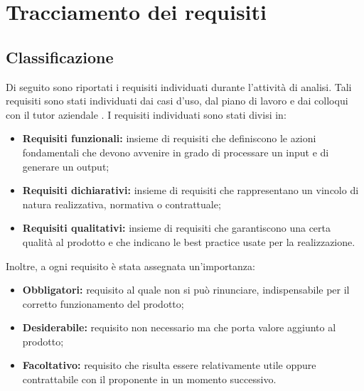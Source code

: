 \section{Tracciamento dei requisiti}\label{sec:tracciamento-dei-requisiti}
\setcounter{rowcount}{0}
\setcounter{subCount}{0}

\subsection{Classificazione}\label{subsec:classificazione}
Di seguito sono riportati i requisiti individuati durante l'attività di analisi.
Tali requisiti sono stati individuati dai casi d'uso, dal piano di lavoro e dai colloqui con il tutor aziendale \tutorAziendale.
I requisiti individuati sono stati divisi in:
\begin{itemize}
    \item \textbf{Requisiti funzionali:} insieme di requisiti che definiscono le azioni fondamentali che devono avvenire in grado di processare un input e di generare un output;
    \item \textbf{Requisiti dichiarativi:} insieme di requisiti che rappresentano un vincolo di natura realizzativa, normativa o contrattuale;
    \item \textbf{Requisiti qualitativi:} insieme di requisiti che garantiscono una certa qualità al prodotto e che indicano le best practice usate per la realizzazione.
\end{itemize}
Inoltre, a ogni requisito è stata assegnata un'importanza:
\begin{itemize}
    \item \textbf{Obbligatori:} requisito al quale non si può rinunciare, indispensabile per il corretto funzionamento del prodotto;
    \item \textbf{Desiderabile:} requisito non necessario ma che porta valore aggiunto al prodotto;
    \item \textbf{Facoltativo:} requisito che risulta essere relativamente utile oppure contrattabile con il proponente in un momento successivo.
\end{itemize}

